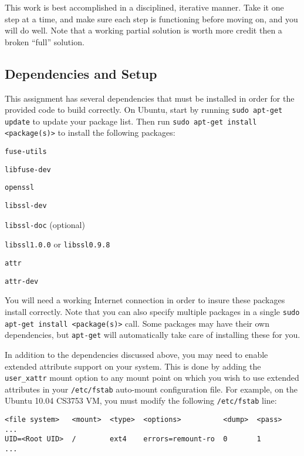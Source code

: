 \documentclass[12pt]{article}
\newenvironment{packed_item}{
\begin{itemize}
  \setlength{\itemsep}{1pt}
  \setlength{\parskip}{0pt}
  \setlength{\parsep}{0pt}
}{\end{itemize}}
\begin{document}
This work is best accomplished in a disciplined, iterative manner. Take
it one step at a time, and make sure each step is functioning before
moving on, and you will do well. Note that a working partial solution
is worth more credit then a broken ``full'' solution.

\subsection{Dependencies and Setup}
This assignment has several dependencies that must be installed in order
for the provided code to build correctly. On Ubuntu, start
by running \texttt{sudo apt-get update} to update your package
list. Then run \texttt{sudo apt-get install <package(s)>} to install the
following packages:

\begin{packed_item}
\item \texttt{fuse-utils}
\item \texttt{libfuse-dev}
\item \texttt{openssl}
\item \texttt{libssl-dev}
\item \texttt{libssl-doc} (optional)
\item \texttt{libssl1.0.0} or \texttt{libssl0.9.8}
\item \texttt{attr}
\item \texttt{attr-dev}
\end{packed_item}

You will need a working Internet connection in order to insure these
packages install correctly. Note that you can also specify multiple
packages in a single \texttt{sudo apt-get install <package(s)>}
call. Some packages may have their own dependencies, but
\texttt{apt-get} will automatically take care of installing these for you.

In addition to the dependencies discussed above, you may need to
enable extended attribute support on your system. This is done by
adding the \texttt{user\_xattr} mount option to any mount point on
which you wish to use extended attributes in your \texttt{/etc/fstab}
auto-mount configuration file. For example, on the Ubuntu 10.04 CS3753
VM, you must modify the following \texttt{/etc/fstab} line:

\begin{verbatim}
<file system>   <mount>  <type>  <options>          <dump>  <pass> 
...
UID=<Root UID>  /        ext4    errors=remount-ro  0       1
...
\end{verbatim}
\end{document}
